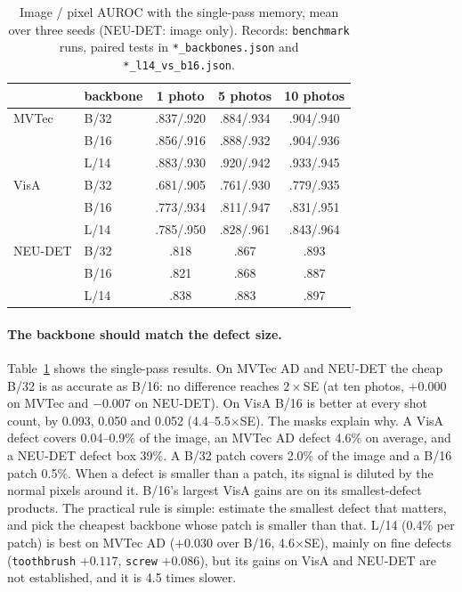 \documentclass[10pt,twocolumn]{article}
\begin{document}
\begin{table}[t]
\centering\small
\caption{Image / pixel AUROC with the single-pass memory, mean over three seeds
(NEU-DET: image only). Records: \texttt{benchmark} runs, paired tests in
\texttt{*\_backbones.json} and \texttt{*\_l14\_vs\_b16.json}.}
\label{tab:main}
\setlength{\tabcolsep}{4pt}
\begin{tabular}{llccc}
\toprule
 & backbone & 1 photo & 5 photos & 10 photos \\
\midrule
MVTec & B/32 & .837/.920 & .884/.934 & .904/.940 \\
      & B/16 & .856/.916 & .888/.932 & .904/.936 \\
      & L/14 & .883/.930 & .920/.942 & .933/.945 \\
\midrule
VisA  & B/32 & .681/.905 & .761/.930 & .779/.935 \\
      & B/16 & .773/.934 & .811/.947 & .831/.951 \\
      & L/14 & .785/.950 & .828/.961 & .843/.964 \\
\midrule
NEU-DET & B/32 & .818 & .867 & .893 \\
      & B/16 & .821 & .868 & .887 \\
      & L/14 & .838 & .883 & .897 \\
\bottomrule
\end{tabular}
\end{table}

\paragraph{The backbone should match the defect size.} Table~\ref{tab:main} shows
the single-pass results. On MVTec AD and NEU-DET the cheap B/32 is as accurate as
B/16: no difference reaches $2\times$SE (at ten photos, $+0.000$ on MVTec and
$-0.007$ on NEU-DET). On VisA B/16 is better at every shot count, by 0.093, 0.050
and 0.052 (4.4--5.5$\times$SE). The masks explain why. A VisA defect covers
0.04--0.9\% of the image, an MVTec AD defect 4.6\% on average, and a NEU-DET
defect box 39\%. A B/32 patch covers 2.0\% of the image and a B/16 patch 0.5\%.
When a defect is smaller than a patch, its signal is diluted by the normal pixels
around it. B/16's largest VisA gains are on its smallest-defect products. The
practical rule is simple: estimate the smallest defect that matters, and pick the
cheapest backbone whose patch is smaller than that. L/14 ($0.4\%$ per patch) is
best on MVTec AD ($+0.030$ over B/16, 4.6$\times$SE), mainly on fine defects
(\texttt{toothbrush} $+0.117$, \texttt{screw} $+0.086$), but its gains on VisA and
NEU-DET are not established, and it is 4.5 times slower.
\end{document}
